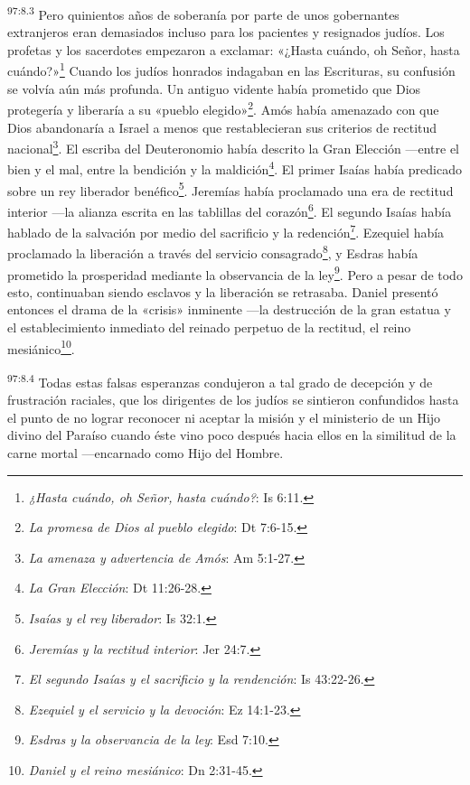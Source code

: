 \par
\textsuperscript{97:8.3} Pero quinientos años de soberanía por parte de unos gobernantes extranjeros eran demasiados incluso para los pacientes y resignados judíos. Los profetas y los sacerdotes empezaron a exclamar: «¿Hasta cuándo, oh Señor, hasta cuándo?»\footnote{\textit{¿Hasta cuándo, oh Señor, hasta cuándo?}: Is 6:11.} Cuando los judíos honrados indagaban en las Escrituras, su confusión se volvía aún más profunda. Un antiguo vidente había prometido que Dios protegería y liberaría a su «pueblo elegido»\footnote{\textit{La promesa de Dios al pueblo elegido}: Dt 7:6-15.}. Amós había amenazado con que Dios abandonaría a Israel a menos que restablecieran sus criterios de rectitud nacional\footnote{\textit{La amenaza y advertencia de Amós}: Am 5:1-27.}. El escriba del Deuteronomio había descrito la Gran Elección ---entre el bien y el mal, entre la bendición y la maldición\footnote{\textit{La Gran Elección}: Dt 11:26-28.}. El primer Isaías había predicado sobre un rey liberador benéfico\footnote{\textit{Isaías y el rey liberador}: Is 32:1.}. Jeremías había proclamado una era de rectitud interior ---la alianza escrita en las tablillas del corazón\footnote{\textit{Jeremías y la rectitud interior}: Jer 24:7.}. El segundo Isaías había hablado de la salvación por medio del sacrificio y la redención\footnote{\textit{El segundo Isaías y el sacrificio y la rendención}: Is 43:22-26.}. Ezequiel había proclamado la liberación a través del servicio consagrado\footnote{\textit{Ezequiel y el servicio y la devoción}: Ez 14:1-23.}, y Esdras había prometido la prosperidad mediante la observancia de la ley\footnote{\textit{Esdras y la observancia de la ley}: Esd 7:10.}. Pero a pesar de todo esto, continuaban siendo esclavos y la liberación se retrasaba. Daniel presentó entonces el drama de la «crisis» inminente ---la destrucción de la gran estatua y el establecimiento inmediato del reinado perpetuo de la rectitud, el reino mesiánico\footnote{\textit{Daniel y el reino mesiánico}: Dn 2:31-45.}.

\par
\textsuperscript{97:8.4} Todas estas falsas esperanzas condujeron a tal grado de decepción y de frustración raciales, que los dirigentes de los judíos se sintieron confundidos hasta el punto de no lograr reconocer ni aceptar la misión y el ministerio de un Hijo divino del Paraíso cuando éste vino poco después hacia ellos en la similitud de la carne mortal ---encarnado como Hijo del Hombre.

